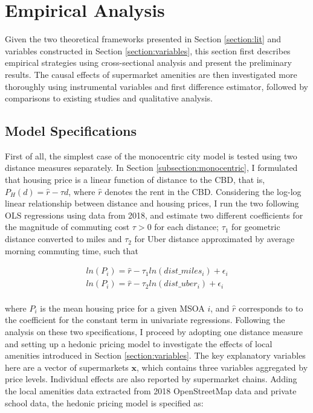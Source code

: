 \documentclass{article}
\begin{document}
\section{Empirical Analysis} \label{section:model}
Given the two theoretical frameworks presented in Section \ref{section:lit} and variables constructed in Section \ref{section:variables}, this section first describes empirical strategies using cross-sectional analysis and present the preliminary results. The causal effects of supermarket amenities are then investigated more thoroughly using instrumental variables and first difference estimator, followed by comparisons to existing studies and qualitative analysis.

\subsection{Model Specifications} \label{subsection:specifications}
First of all, the simplest case of the monocentric city model is tested using two distance measures separately. In Section \ref{subsection:monocentric}, I formulated that housing price is a linear function of distance to the CBD, that is, $P_H(d) = \hat{r} - \tau d$, where $\hat{r}$ denotes the rent in the CBD. Considering the log-log linear relationship between distance and housing prices, I run the two following OLS regressions using data from 2018, and estimate two different coefficients for the magnitude of commuting cost $\tau > 0$ for each distance; $\tau_1$ for geometric distance converted to miles and $\tau_2$ for Uber distance approximated by average morning commuting time, such that

\begin{gather*}
ln(P_i) = \hat{r} - \tau_1 ln(dist\_miles_i) + \epsilon_i \\
ln(P_i) = \hat{r} - \tau_2 ln(dist\_uber_i) + \epsilon_i
\end{gather*}
\\
where $P_i$ is the mean housing price for a given MSOA $i$, and $\hat{r}$ corresponds to to the coefficient for the constant term in univariate regressions. Following the analysis on these two specifications, I proceed by adopting one distance measure and setting up a hedonic pricing model to investigate the effects of local amenities introduced in Section \ref{section:variables}. The key explanatory variables here are a vector of supermarkets $\boldsymbol{x}$, which contains three variables aggregated by price levels. Individual effects are also reported by supermarket chains. Adding the local amenities data extracted from 2018 OpenStreetMap data and private school data, the hedonic pricing model is specified as:
\end{document}
